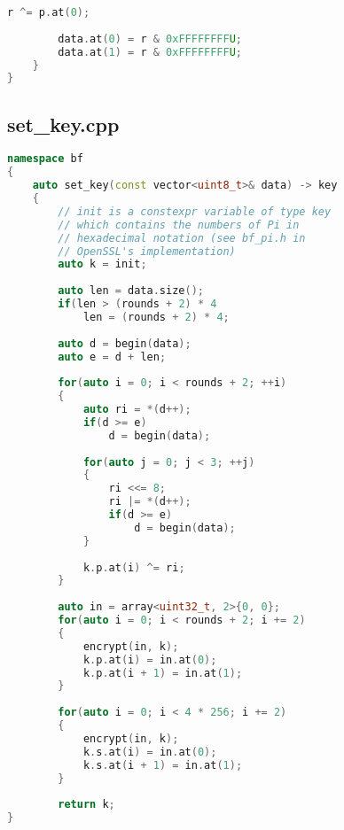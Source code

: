 \begin{appendix}
\begin{lstlisting}[language=C++]
        r ^= p.at(0);
        
        data.at(0) = r & 0xFFFFFFFFU;
        data.at(1) = r & 0xFFFFFFFFU;
    }
}
\end{lstlisting}

\subsection{set\_key.cpp}

\begin{lstlisting}[language=C++]
namespace bf
{
    auto set_key(const vector<uint8_t>& data) -> key
    {
        // init is a constexpr variable of type key
        // which contains the numbers of Pi in
        // hexadecimal notation (see bf_pi.h in
        // OpenSSL's implementation)
        auto k = init;
        
        auto len = data.size();
        if(len > (rounds + 2) * 4
            len = (rounds + 2) * 4;
            
        auto d = begin(data);
        auto e = d + len;
        
        for(auto i = 0; i < rounds + 2; ++i)
        {
            auto ri = *(d++);
            if(d >= e)
                d = begin(data);
                
            for(auto j = 0; j < 3; ++j)
            {
                ri <<= 8;
                ri |= *(d++);
                if(d >= e)
                    d = begin(data);
            }
            
            k.p.at(i) ^= ri;
        }
        
        auto in = array<uint32_t, 2>{0, 0};
        for(auto i = 0; i < rounds + 2; i += 2)
        {
            encrypt(in, k);
            k.p.at(i) = in.at(0);
            k.p.at(i + 1) = in.at(1);
        }
        
        for(auto i = 0; i < 4 * 256; i += 2)
        {
            encrypt(in, k);
            k.s.at(i) = in.at(0);
            k.s.at(i + 1) = in.at(1);
        }
        
        return k;
}
\end{lstlisting}

\end{appendix}